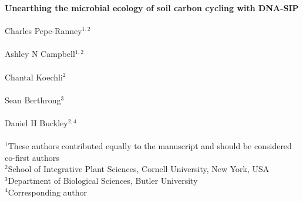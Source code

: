 \textbf{Unearthing the microbial ecology of soil carbon cycling with DNA-SIP}\\
\\
Charles Pepe-Ranney$^{1,2}$\\
\\
Ashley N Campbell$^{1,2}$\\
\\
Chantal Koechli$^{2}$\\
\\
Sean Berthrong$^{3}$\\
\\
Daniel H Buckley$^{2,4}$\\
\\
$^{1}$These authors contributed equally to the manuscript and should be considered co-first authors\\
$^{2}$School of Integrative Plant Sciences, Cornell University, New York, USA\\
$^{3}$Department of Biological Sciences, Butler University\\
$^{4}$Corresponding author\\
